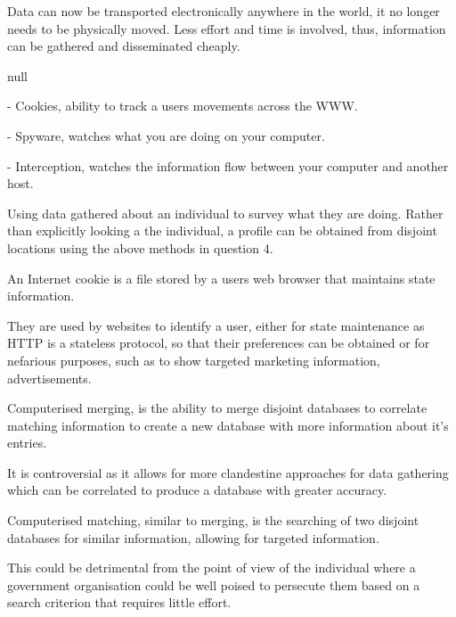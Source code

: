 Data can now be transported electronically anywhere in the world, it no longer needs to be physically moved. Less effort and time is involved, thus, information can be gathered and disseminated cheaply.




null



\item - Cookies, ability to track a users movements across the WWW.
\item - Spyware, watches what you are doing on your computer.
\item - Interception, watches the information flow between your computer and another host.


Using data gathered about an individual to survey what they are doing. Rather than explicitly looking a the individual, a profile can be obtained from disjoint locations using the above methods in question 4.


An Internet cookie is a file stored by a users web browser that maintains state information.

They are used by websites to identify a user, either for state maintenance as HTTP is a stateless protocol, so that their preferences can be obtained or for nefarious purposes, such as to show targeted marketing information, advertisements.


Computerised merging, is the ability to merge disjoint databases to correlate matching information to create a new database with more information about it's entries.

It is controversial as it allows for more clandestine approaches for data gathering which can be correlated to produce a database with greater accuracy.


Computerised matching, similar to merging, is the searching of two disjoint databases for similar information, allowing for targeted information.

This could be detrimental from the point of view of the individual where a government organisation could be well poised to persecute them based on a search criterion that requires little effort.


